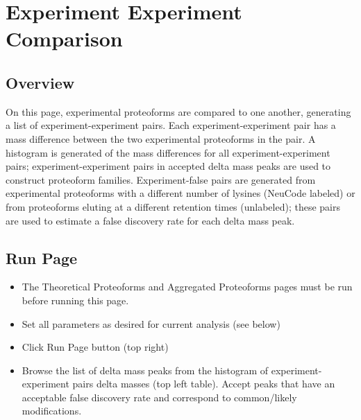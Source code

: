 
\section{Experiment Experiment Comparison}

\subsection{Overview}

On this page, experimental proteoforms are compared to one another, generating a list of experiment-experiment pairs. Each experiment-experiment pair has a mass difference between the two experimental proteoforms in the pair. A histogram is generated of the mass differences for all experiment-experiment pairs; experiment-experiment pairs in accepted delta mass peaks are used to construct proteoform families. Experiment-false pairs are generated from experimental proteoforms with a different number of lysines (NeuCode labeled) or from proteoforms eluting at a different retention times (unlabeled); these pairs are used to estimate a false discovery rate for each delta mass peak. 

\subsection{Run Page}
\begin{itemize}
\item The Theoretical Proteoforms and Aggregated Proteoforms pages must be run before running this page.
\item Set all parameters as desired for current analysis (see below)
\item Click Run Page button (top right)
\item Browse the list of delta mass peaks from the histogram of experiment-experiment pairs delta masses (top left table). Accept peaks that have an acceptable false discovery rate and correspond to common/likely modifications. 
\end{itemize}

